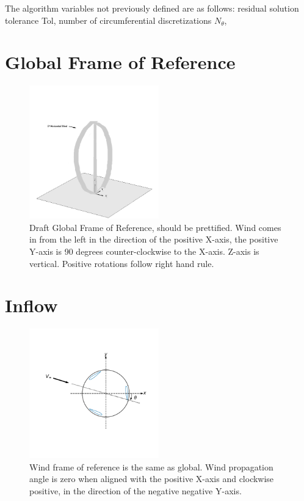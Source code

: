 \documentclass[11pt]{article}
\begin{document}
 The algorithm variables not previously defined are as follows: residual solution tolerance Tol, number of circumferential discretizations $N_{\theta}$,

\section{Global Frame of Reference}

\begin{figure}[H]
\centering
\vspace{-12pt}
\includegraphics[trim={0 0 0 0},clip,width=0.5\textwidth]{../figs/global_FOR.png}
\vspace{-12pt}
\caption{Draft Global Frame of Reference, should be prettified.  Wind comes in from the left in the direction of the positive X-axis, the positive Y-axis is 90 degrees counter-clockwise to the X-axis.  Z-axis is vertical.  Positive rotations follow right hand rule.}
\label{fig:ac_velocities}
\end{figure}

\section{Inflow}

\begin{figure}[H]
\centering
\vspace{-12pt}
\includegraphics[trim={1.3cm 2.4cm .5cm 1.5cm},clip,width=0.5\textwidth]{../figs/inflow_wind}
\vspace{-12pt}
\caption{Wind frame of reference is the same as global.  Wind propagation angle is zero when aligned with the positive X-axis and clockwise positive, in the direction of the negative negative Y-axis.}
\label{fig:ac_velocities}
\end{figure}
\end{document}
